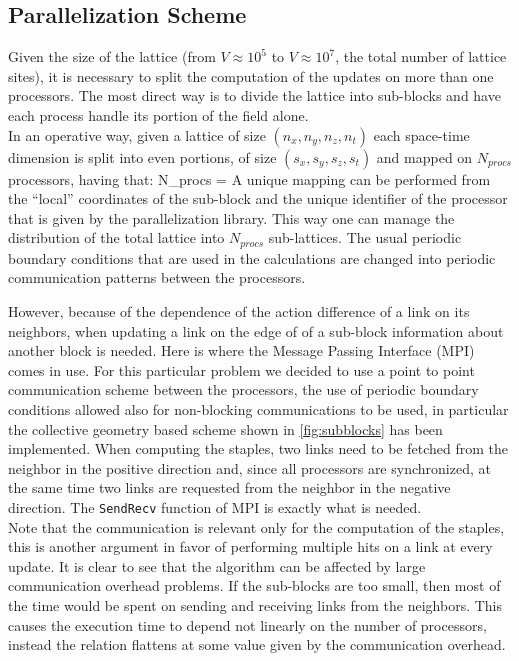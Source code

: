 \subsection{Parallelization Scheme}
\label{sec:para_gen}
Given the size of the lattice (from $V \approx 10^5$ to $V\approx 10^7$, the total number of lattice sites), it is necessary to split the computation of the updates on more than one processors. The most direct way is to divide the lattice into sub-blocks and have each process handle its portion of the field alone. \\
In an operative way, given a lattice of size $(n_x, n_y, n_z, n_t)$ each space-time dimension is split into even portions, of size $(s_x, s_y, s_z, s_t)$ and mapped on $N_{procs}$ processors, having that:
\beq
N_{procs} =  \times {} \times {}  \times {}
\eeq 
A unique mapping can be performed from the ``local'' coordinates of the sub-block and the unique identifier of the processor that is given by the parallelization library. This way one can manage the distribution of the total lattice into $N_{procs}$ sub-lattices. The usual periodic boundary conditions that are used in the calculations are changed into periodic communication patterns between the processors.



However, because of the dependence of the action difference of a link on its neighbors, when updating a link on the edge of of a sub-block information about another block is needed. Here is where the Message Passing Interface (MPI) comes in use. For this particular problem we decided to use a point to point communication scheme between the processors, the use of periodic boundary conditions allowed also for non-blocking communications to be used, in particular the collective geometry based scheme shown in \cref{fig:subblocks} has been implemented. When computing the staples, two links need to be fetched from the neighbor in the positive direction and, since all processors are synchronized, at the same time two links are requested from the neighbor in the negative direction. The \texttt{SendRecv} function of MPI is exactly what is needed.\\ 
Note that the communication is relevant only for the computation of the staples, this is another argument in favor of performing multiple hits on a link at every update. It is clear to see that the algorithm can be affected by large communication overhead problems. If the sub-blocks are too small, then most of the time would be spent on sending and receiving links from the neighbors. This causes the execution time to depend not linearly on the number of processors, instead the relation flattens at some value given by the communication overhead.

